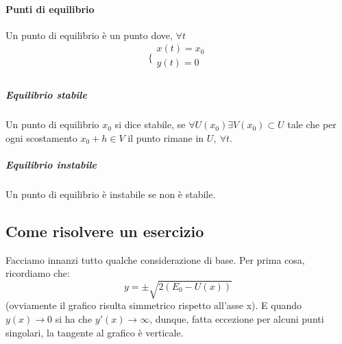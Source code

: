 \documentclass[a4paper,12pt]{article}
\begin{document}
\paragraph{Punti di equilibrio}
Un punto di equilibrio è un punto dove, $\forall t$
$$\bigg\{ \begin{array}{l}
x(t) = x_0\\
y(t) = 0\\
\end{array}$$
\subparagraph{Equilibrio stabile}
Un punto di equilibrio $x_0$ si dice stabile, se $\forall U(x_0) \exists V(x_0) \subset U $  tale che per ogni scostamento $x_0 + h \in V$ il punto rimane in $U,\ \forall t$.
\subparagraph{Equilibrio instabile}
Un punto di equilibrio è instabile se non è stabile.

\subsection{Come risolvere un esercizio}
Facciamo innanzi tutto qualche considerazione di base. Per prima cosa, ricordiamo che:
$$y = \pm \sqrt{2(E_0-U(x))}$$
    (ovviamente il grafico risulta simmetrico rispetto all'asse x).
E quando $y(x)\to 0$ si ha che $y'(x) \to \infty$, dunque, fatta eccezione per alcuni punti singolari, la tangente al grafico è verticale.
\end{document}
